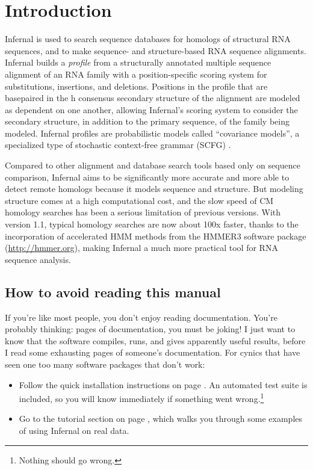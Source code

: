 \section{Introduction}
\label{section:introduction}
\setcounter{footnote}{0}

Infernal is used to search sequence databases for homologs of
structural RNA sequences, and to make sequence- and structure-based
RNA sequence alignments. Infernal builds a \emph{profile} from a
structurally annotated multiple sequence alignment of an RNA family
with a position-specific scoring system for substitutions, insertions,
and deletions. Positions in the profile that are basepaired in the
  h consensus secondary structure of the alignment are modeled as
dependent on one another, allowing Infernal's scoring system to
consider the secondary structure, in addition to the primary sequence,
of the family being modeled. Infernal profiles are probabilistic
models called ``covariance models'', a specialized type of stochastic
context-free grammar (SCFG) \citep{Lari90}.

Compared to other alignment and database search tools based only on
sequence comparison, Infernal aims to be significantly more accurate
and more able to detect remote homologs because it models sequence
and structure. But modeling structure comes at a high computational
cost, and the slow speed of CM homology searches has been a serious
limitation of previous versions. With
version 1.1, typical homology searches are now about 100x faster,
thanks to the incorporation of accelerated HMM methods from the HMMER3
software package (\url{http://hmmer.org}), making Infernal a much more
practical tool for RNA sequence analysis.

\subsection{How to avoid reading this manual}

If you're like most people, you don't enjoy reading documentation.
You're probably thinking: \pageref{manualend} pages of documentation,
you must be joking! I just want to know that the software compiles,
runs, and gives apparently useful results, before I read some
\pageref{manualend} exhausting pages of someone's documentation. For
cynics that have seen one too many software packages that don't work:

\begin{itemize}
\item Follow the quick installation instructions on page
      \pageref{section:installation}. An automated test suite
      is included, so you will know immediately if something
      went wrong.\footnote{Nothing should go wrong.}
\item Go to the tutorial section on page
\pageref{section:tutorial}, which walks you through some examples of
using Infernal on real data.
\end{itemize}

